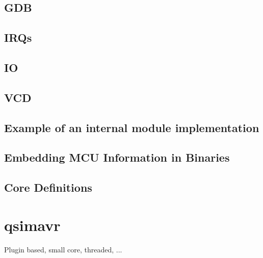 \subsection{GDB}
\subsection{IRQs}
\subsection{IO}
\subsection{VCD}
\subsection{Example of an internal module implementation} %
\subsection{Embedding MCU Information in Binaries}
\subsection{Core Definitions}

\section{qsimavr}

Plugin based, small core, threaded, ...

